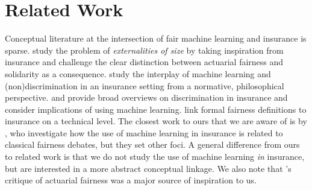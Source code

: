 \documentclass[11pt]{article} %
\begin{document}





\section{Related Work}
Conceptual literature at the intersection of fair machine learning and insurance is sparse. 
\citet{donahue2021better} study the problem of \textit{externalities of size} by taking inspiration from insurance and challenge the clear distinction between actuarial fairness and solidarity as a consequence. \citet{loi2021choosing} study the interplay of machine learning and (non)discrimination in an insurance setting from a normative, philosophical perspective. \citet{frees2023discriminating} and \citet{charpentier2022} provide broad overviews on discrimination in insurance and consider implications of using machine learning. \citet{xin2022anti} link formal fairness definitions to insurance on a technical level. The closest work to ours that we are aware of is by \citet{barry2022fairness}, who investigate how the use of machine learning in insurance is related to classical fairness debates, but they set other foci. A general difference from ours to related work is that we do not study the use of machine learning \textit{in} insurance, but are interested in a more abstract conceptual linkage. We also note that \citeauthor{frezal2020fairness}'s \citeyearpar{frezal2020fairness} critique of actuarial fairness was a major source of inspiration to us.
\end{document}
